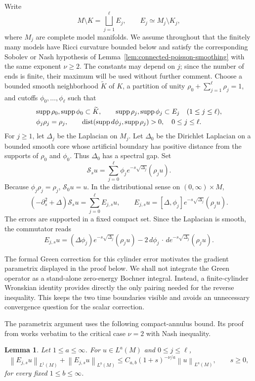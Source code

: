 \documentclass[12pt]{amsart}
\newcommand{\cdo}{\, \cdot \,}
\newcommand{\supp}{{\rm supp}{\hspace{.05cm}}}
\newcommand{\dist}{\operatorname{dist}}
\newcommand{\norm}[2]{\left\lVert #1\right\rVert_{#2}}
\newtheorem{lemma}[theorem]{Lemma}
\theoremstyle{remark}
\begin{document}
Write
\[
 M\setminus K=\bigsqcup_{j=1}^{\ell}E_j,
 \qquad E_j\simeq M_j\setminus K_j,
\]
where $M_j$ are complete model manifolds.  We assume throughout
that the finitely many models have Ricci curvature bounded below and
satisfy the corresponding Sobolev or Nash hypothesis of Lemma~\ref{lem:connected-poisson-smoothing} with the same exponent $\nu \ge2$.
The constants may depend on $j$; since the number of ends is finite, their
maximum will be used without further comment.
Choose a bounded smooth neighborhood $\widetilde K$ of $K$, a partition of
unity $\rho_0+\sum_{j=1}^{\ell}\rho_j=1$, and cutoffs
$\phi_0,\ldots,\phi_\ell$ such that
\begin{align*}
 &\supp\rho_0,\supp\phi_0\subset\widetilde K,
 \qquad \supp\rho_j,\supp\phi_j\subset E_j\quad(1\leq j\leq\ell),\\
 &\phi_j\rho_j=\rho_j,
 \qquad \dist(\supp d\phi_j,\supp\rho_j)>0,
 \quad 0\leq j\leq\ell.
\end{align*}
For $j\geq1$, let $\Delta_j$ be the Laplacian on $M_j$.
Let $\Delta_0$ be the Dirichlet Laplacian on a bounded smooth core whose
artificial boundary has positive distance from the supports of $\rho_0$ and
$\phi_0$.  Thus $\Delta_0$ has a spectral gap.  Set
\[
 \mathcal S_su=\sum_{j=0}^{\ell}
 \phi_je^{-s\sqrt{\Delta_j}}(\rho_ju).
\]
Because $\phi_j\rho_j=\rho_j$, $\mathcal S_0u=u$.  In the distributional
sense on $(0,\infty)\times M$,
\[
 \left(-\partial_s^2+\Delta\right)\mathcal S_su
 =\sum_{j=0}^{\ell}E_{j,s}u,
 \qquad
 E_{j,s}u=[\Delta,\phi_j]
 e^{-s\sqrt{\Delta_j}}(\rho_ju).
\]
The errors are supported in a fixed compact set.  Since the Laplacian is
smooth, the commutator reads
\[
 E_{j,s}u=(\Delta\phi_j)e^{-s\sqrt{\Delta_j}}(\rho_ju)
 -2\,d\phi_j\mathbin{\cdo}d e^{-s\sqrt{\Delta_j}}(\rho_ju).
\]

The formal Green correction for this cylinder error motivates the gradient
parametrix displayed in the proof below.  We shall not integrate the Green
operator as a stand-alone zero-energy Bochner integral.  Instead, a
finite-cylinder Wronskian identity provides directly the only pairing needed
for the reverse inequality.  This keeps the two time boundaries visible and
avoids an unnecessary convergence question for the scalar correction.

The parametrix argument uses the following compact-annulus bound. Its proof from \cite[Lemma~3.1]{Carron07} works verbatim to the critical case $\nu=2$ with Nash inequality.

\begin{lemma}
\label{lem:connected-error-bound}
\cite[Lemma~3.1]{Carron07}
Let $1\leq a\leq\infty$.  For $u\in L^a(M)$ and
$0\leq j\leq\ell$,
\[
 \norm{E_{j,s}u}{L^1(M)}
 +\norm{E_{j,s}u}{L^b(M)}
 \leq C_{a,b}(1+s)^{-\nu/a}\norm u{L^a(M)},
 \qquad s\geq0,
\]
for every fixed $1\leq b\leq\infty$.
\end{lemma}
\end{document}
